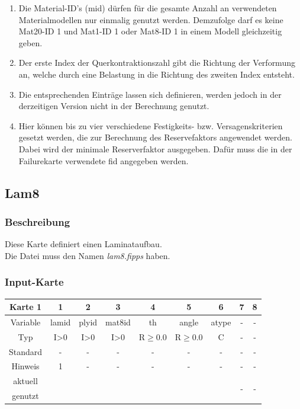 \documentclass[11pt,titlepage,listof=totoc,bibliography=totoc,twoside]{scrreprt}
\begin{document}
{{\begin{enumerate}
\item Die Material-ID's (mid) dürfen für die gesamte Anzahl an verwendeten Materialmodellen nur einmalig genutzt werden. Demzufolge darf es keine Mat20-ID 1 und Mat1-ID 1 oder Mat8-ID 1 in einem Modell gleichzeitig geben.
\item Der erste Index der Querkontraktionszahl gibt die Richtung der Verformung an, welche durch eine Belastung in die Richtung des zweiten Index entsteht.
\item Die entsprechenden Einträge lassen sich definieren, werden jedoch in der derzeitigen Version nicht in der Berechnung genutzt.
\item Hier können bis zu vier verschiedene Festigkeits- bzw. Versagenskriterien gesetzt werden, die zur Berechnung des Reservefaktors angewendet werden. Dabei wird der minimale Reserverfaktor ausgegeben. Dafür muss die in der Failurekarte verwendete fid angegeben werden.
\end{enumerate}

\newpage

\subsection{Lam8}

\subsubsection{Beschreibung}

Diese Karte definiert einen Laminataufbau.\\
Die Datei muss den Namen \emph{lam8.fipps} haben.

\subsubsection{Input-Karte}

\begin{table}[htbp]
\centering
\begin{tabularx}{\textwidth}{cCCCCCCCC}
\toprule
Karte 1	& 1		& 2		& 3		& 4		& 5		& 6		& 7		& 8		\\
\midrule
Variable& lamid		& plyid		& mat8id	& th		& angle		& atype		& -		& -		\\
Typ	& I>0		& I>0		& I>0		& R$\ge$0.0	& R$\ge$0.0	& C		& -		& -		\\
Standard& -		& -		& -		& -		& -		& -		& -		& -		\\
Hinweis	& 1		& -		& -		& -		& -		& -		& -		& -		\\
aktuell	& 	& 	& 	& 	& 	& 	& \multirow{2}{*}{-}	& 	\\
genutzt \\
\bottomrule
\end{tabularx}
\end{table}

}}
\end{document}
